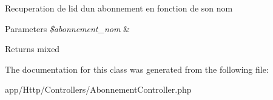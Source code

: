 Recuperation de l\textquotesingle{}id d\textquotesingle{}un abonnement en fonction de son nom 
\begin{DoxyParams}{Parameters}
{\em \$abonnement\+\_\+nom} & \\
\hline
\end{DoxyParams}
\begin{DoxyReturn}{Returns}
mixed 
\end{DoxyReturn}


The documentation for this class was generated from the following file\+:\begin{DoxyCompactItemize}
\item 
app/\+Http/\+Controllers/Abonnement\+Controller.\+php\end{DoxyCompactItemize}
